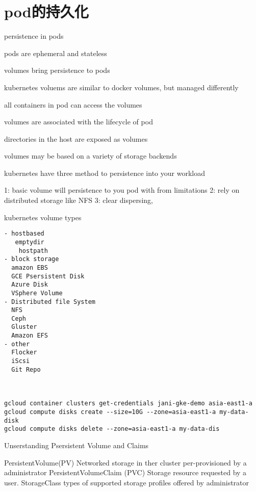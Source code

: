 \section{pod的持久化}

persistence in pods

pods are ephemeral and stateless

volumes bring persistence to pods

kubernetes voluems are similar to docker volumes, but managed differently

all containers in pod can access the volumes

volumes are associated with the lifecycle of pod

directories in the host are exposed as volumes

volumes may be based on a variety of storage backends

kubernetes have three method to persistence into your workload

1:  basic volume will persistence to you pod with from limitations
2: rely on distributed storage like NFS
3: clear dispersing,

kubernetes volume types

\begin{lstlisting}
- hostbased
   emptydir
    hostpath
- block storage
  amazon EBS
  GCE Psersistent Disk
  Azure Disk
  VSphere Volume
- Distributed file System
  NFS
  Ceph
  Gluster
  Amazon EFS
- other
  Flocker
  iScsi
  Git Repo



gcloud container clusters get-credentials jani-gke-demo asia-east1-a
gcloud compute disks create --size=10G --zone=asia-east1-a my-data-disk
gcloud compute disks delete --zone=asia-east1-a my-data-dis

\end{lstlisting}


Unserstanding Psersistent Volume and Claims

PersistentVolume(PV)
  Networked storage in ther cluster per-provisioned  by a administrator
PersistentVolumeClaim (PVC)
  Storage resource requested by a user.
StorageClass
  types of supported storage profiles offered by administrator


